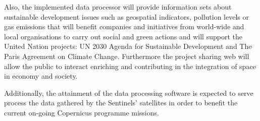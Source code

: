 Also, the implemented data processor will provide information sets about sustainable development issues such as geospatial indicators, pollution levels or gas emissions that will benefit companies and initiatives from world-wide and local organisations to carry out social and green actions and will support the United Nation projects: UN 2030 Agenda for Sustainable Development and The Paris Agreement on Climate Change. Furthermore the project sharing web will allow the public to interact enriching and contributing in the integration of space in economy and society.
 
Additionally, the attainment of the data processing software is expected to serve process the data gathered by the Sentinels' satellites in order to benefit the current on-going Copernicus programme missions.  









